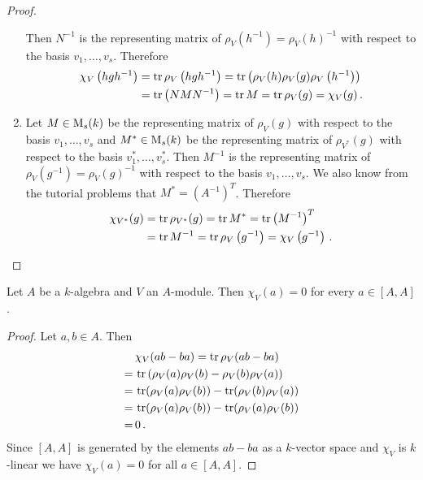\begin{proof}
\begin{enumerate}[label=\emph{\alph*)},leftmargin=*]
      Then $N^{-1}$ is the representing matrix of $\rho_V(h^{-1}) = \rho_V(h)^{-1}$ with respect to the basis $v_1, \dotsc, v_s$.
      Therefore
      \begin{align*}
            \chi_V\left( hgh^{-1} \right)
        &=  \operatorname{tr} \rho_V\left( hgh^{-1} \right)
         =  \operatorname{tr}\left( \rho_V(h) \rho_V(g) \rho_V\left( h^{-1} \right) \right) \\
        &=  \operatorname{tr}\left( NMN^{-1} \right)
         =  \operatorname{tr} M
         =  \operatorname{tr} \rho_V(g)
         =  \chi_V(g) \,.
      \end{align*}
    \item
      Let $M \in \operatorname{M}_s(k)$ be the representing matrix of $\rho_V(g)$ with respect to the basis $v_1, \dotsc, v_s$ and $M^* \in \operatorname{M}_s(k)$ be the representing matrix of $\rho_{V^*}(g)$ with respect to the basis $v_1^*, \dotsc, v_s^*$.
      Then $M^{-1}$ is the representing matrix of $\rho_V(g^{-1}) = \rho_V(g)^{-1}$ with respect to the basis $v_1, \dotsc, v_s$.
      We also know from the tutorial problems that $M^* = \left(A^{-1}\right)^T$.
      Therefore
      \begin{align*}
            \chi_{V^*}(g)
        &=  \operatorname{tr} \rho_{V^*}(g)
         =  \operatorname{tr} M^*
         =  \operatorname{tr} \left(M^{-1}\right)^T \\
        &=  \operatorname{tr} M^{-1}
         =  \operatorname{tr} \rho_V\left( g^{-1} \right)
         =  \chi_V\left( g^{-1} \right) \,.
        \qedhere
      \end{align*}
  \end{enumerate}
\end{proof}


\begin{lem}
  Let $A$ be a $k$-algebra and $V$ an $A$-module.
  Then $\chi_V(a) = 0$ for every $a \in [A,A]$.
\end{lem}
\begin{proof}
  Let $a, b \in A$.
  Then
  \begin{align*}
     &\,  \chi_V(ab - ba)
    =     \operatorname{tr} \rho_V(ab - ba) \\
    =&\,  \operatorname{tr} \left(
                \rho_V(a) \rho_V(b) - \rho_V(b) \rho_V(a)
              \right) \\
    =&\,  \operatorname{tr}(\rho_V(a)\rho_V(b)) - \operatorname{tr}(\rho_V(b)\rho_V(a)) \\
    =&\,  \operatorname{tr}(\rho_V(a)\rho_V(b)) - \operatorname{tr}(\rho_V(a)\rho_V(b)) \\
    =&\,  0 \,.
  \end{align*}
  Since $[A,A]$ is generated by the elements $ab - ba$ as a $k$-vector space and $\chi_V$ is $k$-linear we have $\chi_V(a) = 0$ for all $a \in [A,A]$.
\end{proof}


